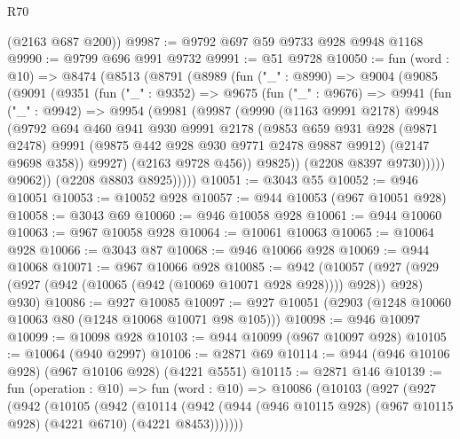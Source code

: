 \begin{lexlean}{R70}
\begin{coremodule}
      (@2163 @687 @200))
@9987 := @9792 @697 @59 @9733 @928 @9948 @1168
@9990 := @9799 @696 @991 @9732
@9991 := @51 @9728
@10050 := fun (word : @10) =>
  @8474
    (@8513
      (@8791
        (@8989
          (fun ("_" : @8990) =>
          @9004
            (@9085
              (@9091
                (@9351
                  (fun ("_" : @9352) =>
                  @9675
                    (fun ("_" : @9676) =>
                    @9941
                      (fun ("_" : @9942) =>
                      @9954
                        (@9981
                          (@9987
                            (@9990
                              (@1163 @9991 @2178)
                              @9948
                              (@9792
                                @694
                                @460
                                @941
                                @930
                                @9991
                                @2178
                                (@9853
                                  @659
                                  @931
                                  @928
                                  (@9871 @2478)
                                  @9991
                                  (@9875 @442 @928 @930 @9771 @2478 @9887 @9912)
                                  (@2147 @9698 @358))
                                @9927)
                              (@2163 @9728 @456))
                            @9825))
                        (@2208 @8397 @9730)))))
                @9062))
            (@2208 @8803 @8925)))))
@10051 := @3043 @55
@10052 := @946 @10051
@10053 := @10052 @928
@10057 := @944 @10053 (@967 @10051 @928)
@10058 := @3043 @69
@10060 := @946 @10058 @928
@10061 := @944 @10060
@10063 := @967 @10058 @928
@10064 := @10061 @10063
@10065 := @10064 @928
@10066 := @3043 @87
@10068 := @946 @10066 @928
@10069 := @944 @10068
@10071 := @967 @10066 @928
@10085 := @942
    (@10057 (@927 (@929 (@927 (@942 (@10065 (@942 (@10069 @10071 @928 @928)))) @928)) @928) @930)
@10086 := @927 @10085
@10097 := @927 @10051 (@2903 (@1248 @10060 @10063 @80 (@1248 @10068 @10071 @98 @105)))
@10098 := @946 @10097
@10099 := @10098 @928
@10103 := @944 @10099 (@967 @10097 @928)
@10105 := @10064 (@940 @2997)
@10106 := @2871 @69
@10114 := @944 (@946 @10106 @928) (@967 @10106 @928) (@4221 @5551)
@10115 := @2871 @146
@10139 := fun (operation : @10) =>
  fun (word : @10) =>
  @10086
    (@10103
      (@927
        (@927
          (@942
            (@10105
              (@942
                (@10114
                  (@942
                    (@944 (@946 @10115 @928) (@967 @10115 @928) (@4221 @6710) (@4221 @8453)))))))

\end{coremodule}
\end{lexlean}
